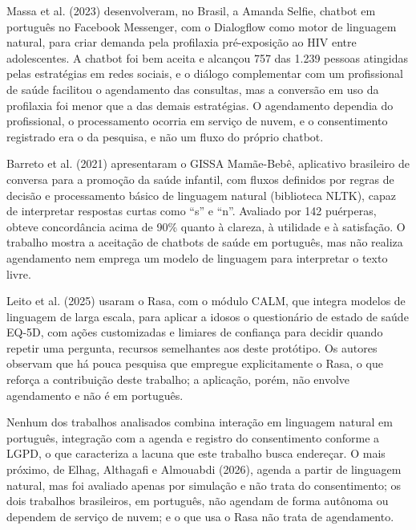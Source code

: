 \documentclass[12pt,a4paper]{extarticle}
\begin{document}
Massa et al. (2023) desenvolveram, no Brasil, a Amanda Selfie, chatbot em português no Facebook Messenger, com o Dialogflow como motor de linguagem natural, para criar demanda pela profilaxia pré-exposição ao HIV entre adolescentes. A chatbot foi bem aceita e alcançou 757 das 1.239 pessoas atingidas pelas estratégias em redes sociais, e o diálogo complementar com um profissional de saúde facilitou o agendamento das consultas, mas a conversão em uso da profilaxia foi menor que a das demais estratégias. O agendamento dependia do profissional, o processamento ocorria em serviço de nuvem, e o consentimento registrado era o da pesquisa, e não um fluxo do próprio chatbot.

Barreto et al. (2021) apresentaram o GISSA Mamãe-Bebê, aplicativo brasileiro de conversa para a promoção da saúde infantil, com fluxos definidos por regras de decisão e processamento básico de linguagem natural (biblioteca NLTK), capaz de interpretar respostas curtas como ``s'' e ``n''. Avaliado por 142 puérperas, obteve concordância acima de 90\% quanto à clareza, à utilidade e à satisfação. O trabalho mostra a aceitação de chatbots de saúde em português, mas não realiza agendamento nem emprega um modelo de linguagem para interpretar o texto livre.

Leito et al. (2025) usaram o Rasa, com o módulo CALM, que integra modelos de linguagem de larga escala, para aplicar a idosos o questionário de estado de saúde EQ-5D, com ações customizadas e limiares de confiança para decidir quando repetir uma pergunta, recursos semelhantes aos deste protótipo. Os autores observam que há pouca pesquisa que empregue explicitamente o Rasa, o que reforça a contribuição deste trabalho; a aplicação, porém, não envolve agendamento e não é em português.

Nenhum dos trabalhos analisados combina interação em linguagem natural em português, integração com a agenda e registro do consentimento conforme a LGPD, o que caracteriza a lacuna que este trabalho busca endereçar. O mais próximo, de Elhag, Althagafi e Almouabdi (2026), agenda a partir de linguagem natural, mas foi avaliado apenas por simulação e não trata do consentimento; os dois trabalhos brasileiros, em português, não agendam de forma autônoma ou dependem de serviço de nuvem; e o que usa o Rasa não trata de agendamento.
\end{document}
